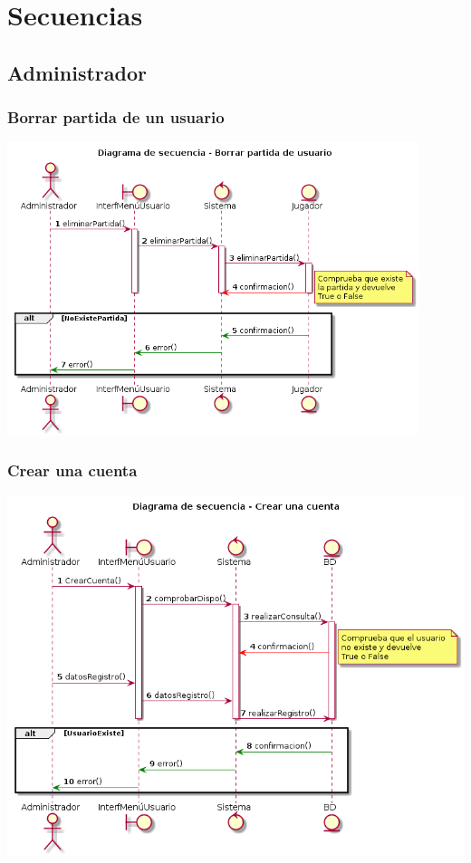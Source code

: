 \section{Secuencias}\label{sec:uc0}


\subsection{Administrador}\label{sec:uc0}
\subsubsection{Borrar partida de un usuario}
  \includegraphics[width=0.9\textwidth]{./imatges/administrador/Borrar_partida_de_usuario.png}
\subsubsection{Crear una cuenta}
  \includegraphics[width=1\textwidth]{./imatges/administrador/Crear_una_cuenta.png}
